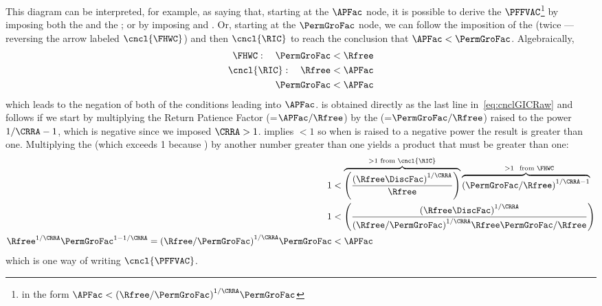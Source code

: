 \documentclass[\econtexRoot/BufferStockTheory]{subfiles}
\begin{document}
This diagram can be interpreted, for example, as saying  that, starting at the $\APFac$ node, it is possible to derive the $\PFFVAC$\footnote{in the form $\APFac < {(\Rfree/\PermGroFac)}^{1/\CRRA}\PermGroFac$} by imposing both the {\GICRaw} and the {\FHWC}; or by imposing {\RIC} and \cncl{\FHWC}.  Or, starting at the $\PermGroFac$ node, we can follow the imposition of the {\FHWC} (twice --- reversing the arrow labeled $\cncl{\FHWC}$) and then $\cncl{\RIC}$ to reach the conclusion that $\APFac < \PermGroFac$.  Algebraically,
\begin{equation}\begin{gathered}\begin{aligned}
  {\FHWC}:~~~ \PermGroFac & < \Rfree 
  \\ \cncl{\RIC}:~~~ \Rfree & < \APFac 
  \\ \PermGroFac & < \APFac \label{eq:cnclGICRaw}
\end{aligned}\end{gathered}\end{equation}
which leads to the negation of both of the conditions leading into $\APFac$.  \cncl{\GICRaw} is obtained directly as the last line in~\eqref{eq:cnclGICRaw} and \cncl{\PFFVAC} follows if we start by multiplying the Return Patience Factor ({\RPFacDefn}=$\APFac/\Rfree$) by the {\FHWFacDefn} (=$\PermGroFac/\Rfree$) raised to the power $1/\CRRA-1$, which is negative since we imposed $\CRRA > 1$.  {\FHWC} implies {\FHWFacDefn} $< 1$ so when {\FHWFacDefn} is raised to a negative power the result is greater than one.
Multiplying the {\RPFacDefn} (which exceeds 1 because \cncl{\RIC}) by another number greater than one yields a product that must be greater than one:
\begin{equation}\begin{gathered}\begin{aligned}
  1  & < \overbrace{\left(\frac{{(\Rfree \DiscFac)}^{1/\CRRA}}{\Rfree}\right)}^{>1 \text{~from~}\cncl{\RIC}}\overbrace{{\left(\PermGroFac/\Rfree\right)}^{1/\CRRA-1}}^{\phantom{\ldots}>1~\text{~from~} \FHWC} \notag
  \\ 1  & < \left(\frac{{(\Rfree \DiscFac)}^{1/\CRRA}}{{(\Rfree/\PermGroFac)}^{1/\CRRA}\Rfree\PermGroFac/\Rfree}\right) \label{eq:cnclFHWFacDefnAndcnclRICImplycnclPFFVAC}
  \\ \Rfree^{1/\CRRA}\PermGroFac^{1 - 1/\CRRA} = {(\Rfree/\PermGroFac)}^{1/\CRRA} \PermGroFac  & < \APFac \notag
\end{aligned}\end{gathered}\end{equation}
which is one way of writing $\cncl{\PFFVAC}$.
\end{document}
